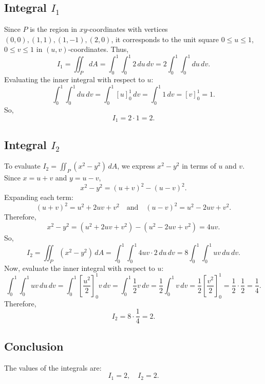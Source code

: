 \documentclass[11pt]{article}
\begin{document}
\begin{enumerate}
    \subsection*{Integral \( I_1 \)}
    Since \( P \) is the region in \( xy \)-coordinates with vertices \( (0, 0), (1, 1), (1, -1), (2, 0) \), it corresponds to the unit square \( 0 \leq u \leq 1 \), \( 0 \leq v \leq 1 \) in \( (u, v) \)-coordinates. Thus,
    \[
    I_1 = \iint_{P} dA = \int_{0}^{1} \int_{0}^{1} 2 \, du \, dv = 2 \int_{0}^{1} \int_{0}^{1} du \, dv.
    \]
    Evaluating the inner integral with respect to \( u \):
    \[
    \int_{0}^{1} \int_{0}^{1} du \, dv = \int_{0}^{1} \left[ u \right]_{0}^{1} \, dv = \int_{0}^{1} 1 \, dv = \left[ v \right]_{0}^{1} = 1.
    \]
    So,
    \[
    I_1 = 2 \cdot 1 = 2.
    \]

    \subsection*{Integral \( I_2 \)}
    To evaluate \( I_2 = \iint_{P} (x^2 - y^2) \, dA \), we express \( x^2 - y^2 \) in terms of \( u \) and \( v \). Since \( x = u + v \) and \( y = u - v \),
    \[
    x^2 - y^2 = (u + v)^2 - (u - v)^2.
    \]
    Expanding each term:
    \[
    (u + v)^2 = u^2 + 2uv + v^2 \quad \text{and} \quad (u - v)^2 = u^2 - 2uv + v^2.
    \]
    Therefore,
    \[
    x^2 - y^2 = (u^2 + 2uv + v^2) - (u^2 - 2uv + v^2) = 4uv.
    \]
    So,
    \[
    I_2 = \iint_{P} (x^2 - y^2) \, dA = \int_{0}^{1} \int_{0}^{1} 4uv \cdot 2 \, du \, dv = 8 \int_{0}^{1} \int_{0}^{1} uv \, du \, dv.
    \]
    Now, evaluate the inner integral with respect to \( u \):
    \[
    \int_{0}^{1} \int_{0}^{1} uv \, du \, dv = \int_{0}^{1} \left[ \frac{u^2}{2} \right]_{0}^{1} v \, dv = \int_{0}^{1} \frac{1}{2} v \, dv = \frac{1}{2} \int_{0}^{1} v \, dv = \frac{1}{2} \left[ \frac{v^2}{2} \right]_{0}^{1} = \frac{1}{2} \cdot \frac{1}{2} = \frac{1}{4}.
    \]
    Therefore,
    \[
    I_2 = 8 \cdot \frac{1}{4} = 2.
    \]

\end{enumerate}

\newpage

\subsection{Conclusion}

The values of the integrals are:
\[
I_1 = 2, \quad I_2 = 2.
\]
\end{document}
